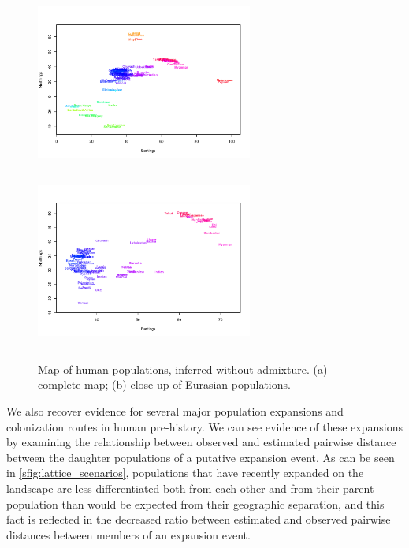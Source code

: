 \documentclass[12pt]{article}
\begin{document}
\begin{figure}
	\centering
			{\includegraphics[width=2.8in,height=2.3in]{figs/globetrotter/globe_NoAd_map.png}}
			{\includegraphics[width=2.8in,height=2.3in]{figs/globetrotter/globe_Eurasia_NoAd_map.png}}
	\caption{Map of human populations, inferred without admixture. (a) complete map; (b) close up of Eurasian 
populations.}\label{sfig:globe_noad_maps}
\end{figure}

We also recover evidence for several major population expansions and colonization routes in human pre-history.  We can see evidence of these expansions by examining the relationship between observed and estimated pairwise distance between the daughter populations of a putative expansion event.   As can be seen in \ref{sfig:lattice_scenarios}, populations that have recently expanded on the landscape are less differentiated both from each other and from their parent population than would be expected from their geographic separation, and this fact is reflected in the decreased ratio between estimated and observed pairwise distances between members of an expansion event.
\end{document}

